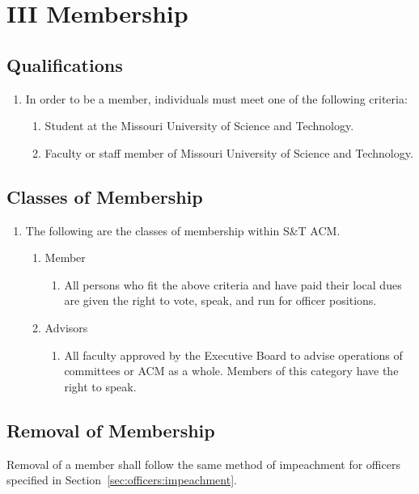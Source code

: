 \section{III \textendash{} Membership}
\subsection{Qualifications}
\begin{enumerate}
  \item In order to be a member, individuals must meet one of the following
    criteria:
    \begin{enumerate}
      \item Student at the Missouri University of Science and Technology.
      \item Faculty or staff member of Missouri University of Science and
        Technology.
    \end{enumerate}
\end{enumerate}

\subsection{Classes of Membership}\label{sec:membership:classes}
\begin{enumerate}
  \item The following are the classes of membership within S\&T ACM.
    \begin{enumerate}[ref={\thesubsection.\theenumi.\theenumii}]
      \item Member\label{sec:membership:classes:member}
        \begin{enumerate}
          \item All persons who fit the above criteria and have paid their
            local dues are given the right to vote, speak, and run for
            officer positions.
        \end{enumerate}
      \item Advisors
        \begin{enumerate}
          \item All faculty approved by the Executive Board to advise
            operations of committees or ACM as a whole. Members of this
            category have the right to speak.
        \end{enumerate}
    \end{enumerate}
\end{enumerate}

\subsection{Removal of Membership}
Removal of a member shall follow the same method of impeachment for officers
specified in Section~\ref{sec:officers:impeachment}.
